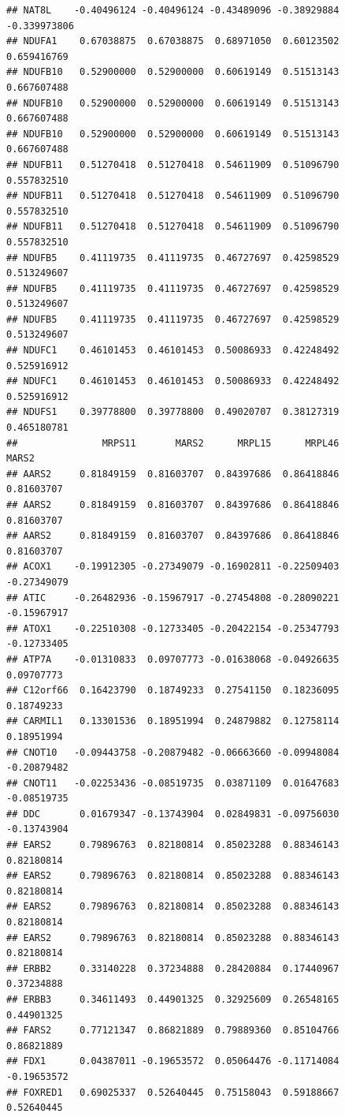 \documentclass[
]{article}
\begin{document}
\begin{verbatim}
## NAT8L    -0.40496124 -0.40496124 -0.43489096 -0.38929884 -0.339973806
## NDUFA1    0.67038875  0.67038875  0.68971050  0.60123502  0.659416769
## NDUFB10   0.52900000  0.52900000  0.60619149  0.51513143  0.667607488
## NDUFB10   0.52900000  0.52900000  0.60619149  0.51513143  0.667607488
## NDUFB10   0.52900000  0.52900000  0.60619149  0.51513143  0.667607488
## NDUFB11   0.51270418  0.51270418  0.54611909  0.51096790  0.557832510
## NDUFB11   0.51270418  0.51270418  0.54611909  0.51096790  0.557832510
## NDUFB11   0.51270418  0.51270418  0.54611909  0.51096790  0.557832510
## NDUFB5    0.41119735  0.41119735  0.46727697  0.42598529  0.513249607
## NDUFB5    0.41119735  0.41119735  0.46727697  0.42598529  0.513249607
## NDUFB5    0.41119735  0.41119735  0.46727697  0.42598529  0.513249607
## NDUFC1    0.46101453  0.46101453  0.50086933  0.42248492  0.525916912
## NDUFC1    0.46101453  0.46101453  0.50086933  0.42248492  0.525916912
## NDUFS1    0.39778800  0.39778800  0.49020707  0.38127319  0.465180781
##               MRPS11       MARS2      MRPL15      MRPL46       MARS2
## AARS2     0.81849159  0.81603707  0.84397686  0.86418846  0.81603707
## AARS2     0.81849159  0.81603707  0.84397686  0.86418846  0.81603707
## AARS2     0.81849159  0.81603707  0.84397686  0.86418846  0.81603707
## ACOX1    -0.19912305 -0.27349079 -0.16902811 -0.22509403 -0.27349079
## ATIC     -0.26482936 -0.15967917 -0.27454808 -0.28090221 -0.15967917
## ATOX1    -0.22510308 -0.12733405 -0.20422154 -0.25347793 -0.12733405
## ATP7A    -0.01310833  0.09707773 -0.01638068 -0.04926635  0.09707773
## C12orf66  0.16423790  0.18749233  0.27541150  0.18236095  0.18749233
## CARMIL1   0.13301536  0.18951994  0.24879882  0.12758114  0.18951994
## CNOT10   -0.09443758 -0.20879482 -0.06663660 -0.09948084 -0.20879482
## CNOT11   -0.02253436 -0.08519735  0.03871109  0.01647683 -0.08519735
## DDC       0.01679347 -0.13743904  0.02849831 -0.09756030 -0.13743904
## EARS2     0.79896763  0.82180814  0.85023288  0.88346143  0.82180814
## EARS2     0.79896763  0.82180814  0.85023288  0.88346143  0.82180814
## EARS2     0.79896763  0.82180814  0.85023288  0.88346143  0.82180814
## EARS2     0.79896763  0.82180814  0.85023288  0.88346143  0.82180814
## ERBB2     0.33140228  0.37234888  0.28420884  0.17440967  0.37234888
## ERBB3     0.34611493  0.44901325  0.32925609  0.26548165  0.44901325
## FARS2     0.77121347  0.86821889  0.79889360  0.85104766  0.86821889
## FDX1      0.04387011 -0.19653572  0.05064476 -0.11714084 -0.19653572
## FOXRED1   0.69025337  0.52640445  0.75158043  0.59188667  0.52640445

\end{verbatim}
\end{document}
